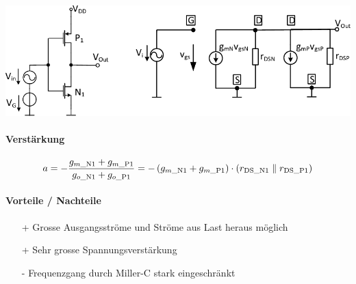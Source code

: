 \includegraphics[width=\columnwidth, align=t]{images/07_verstaerker_mit_parallelem_eingang.pdf}

\paragraph{Verstärkung}

\vspace{-0.2cm}

\[
    a = - \frac{g_{m\_ \rm N1} + g_{m\_ \rm P1}}{g_{o\_ \rm N1} + g_{o\_ \rm P1}} = - \left( g_{m\_ \rm N1} + g_{m\_ \rm P1} \right) \cdot \left( r_{\rm DS\_N1} \parallel r_{\rm DS\_P1} \right)
\]


\paragraph{Vorteile / Nachteile}

\begin{minipage}[t]{0.48\columnwidth}
    \raggedright

    \begin{itemize}
        \item[+] Grosse Ausgangsströme und Ströme aus Last heraus möglich
        \item[+] Sehr grosse Spannungsverstärkung
    \end{itemize}
\end{minipage}
\hfill
\begin{minipage}[t]{0.48\columnwidth}
    \raggedright
    \begin{itemize}
        \item[-] Frequenzgang durch Miller-C stark eingeschränkt
    \end{itemize}
\end{minipage}



